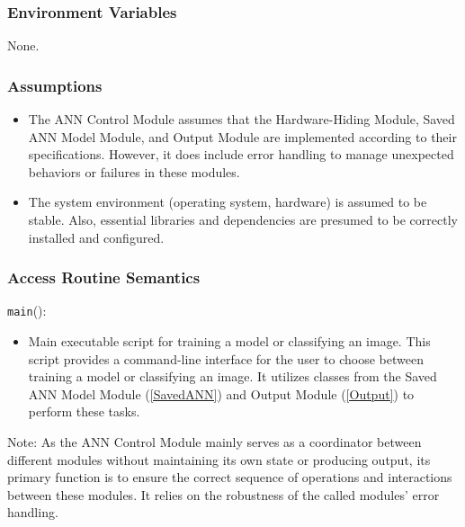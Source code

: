 \documentclass[12pt, titlepage]{article}
\def\code#1{\texttt{#1}}
\begin{document}
\subsubsection{Environment Variables}
None.


\subsubsection{Assumptions}
\begin{itemize}
  \item The ANN Control Module assumes that the Hardware-Hiding Module, Saved ANN Model Module, 
  and Output Module are implemented 
  according to their specifications. However, it does include error handling to manage 
  unexpected behaviors or failures in these modules.
  \item The system environment (operating system, hardware) is assumed to be stable. 
  Also, essential libraries and dependencies are presumed to be correctly installed and configured.
\end{itemize}



\subsubsection{Access Routine Semantics}

\noindent \code{main}():
\begin{itemize}
  \item Main executable script for training a model or classifying an image.
  This script provides a command-line interface for the user to 
  choose between training a model or classifying an image. It utilizes 
  classes from the Saved ANN Model Module (\ref{SavedANN}) and 
  Output Module (\ref{Output}) to perform these tasks.
\end{itemize}

Note: As the ANN Control Module mainly serves as a coordinator between different modules 
without maintaining its own state or producing output, its primary function is to ensure 
the correct sequence of operations and interactions between these modules. It relies on 
the robustness of the called modules' error handling.
\end{document}
